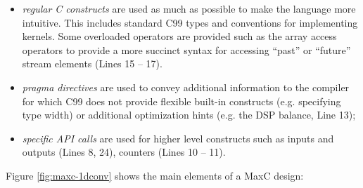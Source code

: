 \begin{itemize}
\item \emph{regular C constructs} are used as much as possible to make
  the language more intuitive. This includes standard C99 types and
  conventions for implementing kernels. Some overloaded operators are
  provided such as the array access operators to provide a more
  succinct syntax for accessing ``past'' or ``future'' stream elements
  (Lines 15 -- 17).

\item \emph{pragma directives} are used to convey additional
  information to the compiler for which C99 does not provide flexible
  built-in constructs (e.g. specifying type width) or additional
  optimization hints (e.g. the DSP balance, Line 13);

\item \emph{specific API calls} are used for higher level constructs
  such as inputs and outputs (Lines 8, 24), counters (Lines 10 -- 11).

\end{itemize}


Figure \ref{fig:maxc-1dconv} shows the main elements of a MaxC design:

